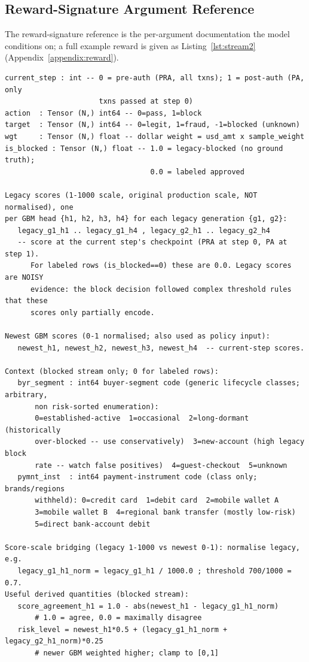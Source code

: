 \documentclass[11pt]{article}
\begin{document}
\subsection{Reward-Signature Argument Reference}
\label{appendix:prompt-sig}
The reward-signature reference is the per-argument documentation the model
conditions on; a full example reward is given as Listing~\ref{lst:stream2}
(Appendix~\ref{appendix:reward}).

\begin{lstlisting}[basicstyle=\ttfamily\scriptsize,breaklines=true,numbers=none,frame=single,captionpos=b,caption={Condensed 19-argument reward-signature reference (anonymized, ASCII).},label={lst:prompt_sig}]
current_step : int -- 0 = pre-auth (PRA, all txns); 1 = post-auth (PA, only
                      txns passed at step 0)
action  : Tensor (N,) int64 -- 0=pass, 1=block
target  : Tensor (N,) int64 -- 0=legit, 1=fraud, -1=blocked (unknown)
wgt     : Tensor (N,) float -- dollar weight = usd_amt x sample_weight
is_blocked : Tensor (N,) float -- 1.0 = legacy-blocked (no ground truth);
                                  0.0 = labeled approved

Legacy scores (1-1000 scale, original production scale, NOT normalised), one
per GBM head {h1, h2, h3, h4} for each legacy generation {g1, g2}:
   legacy_g1_h1 .. legacy_g1_h4 , legacy_g2_h1 .. legacy_g2_h4
   -- score at the current step's checkpoint (PRA at step 0, PA at step 1).
      For labeled rows (is_blocked==0) these are 0.0. Legacy scores are NOISY
      evidence: the block decision followed complex threshold rules that these
      scores only partially encode.

Newest GBM scores (0-1 normalised; also used as policy input):
   newest_h1, newest_h2, newest_h3, newest_h4  -- current-step scores.

Context (blocked stream only; 0 for labeled rows):
   byr_segment : int64 buyer-segment code (generic lifecycle classes; arbitrary,
       non risk-sorted enumeration):
       0=established-active  1=occasional  2=long-dormant (historically
       over-blocked -- use conservatively)  3=new-account (high legacy block
       rate -- watch false positives)  4=guest-checkout  5=unknown
   pymnt_inst  : int64 payment-instrument code (class only; brands/regions
       withheld): 0=credit card  1=debit card  2=mobile wallet A
       3=mobile wallet B  4=regional bank transfer (mostly low-risk)
       5=direct bank-account debit

Score-scale bridging (legacy 1-1000 vs newest 0-1): normalise legacy, e.g.
   legacy_g1_h1_norm = legacy_g1_h1 / 1000.0 ; threshold 700/1000 = 0.7.
Useful derived quantities (blocked stream):
   score_agreement_h1 = 1.0 - abs(newest_h1 - legacy_g1_h1_norm)
       # 1.0 = agree, 0.0 = maximally disagree
   risk_level = newest_h1*0.5 + (legacy_g1_h1_norm + legacy_g2_h1_norm)*0.25
       # newer GBM weighted higher; clamp to [0,1]


\end{lstlisting}
\end{document}
